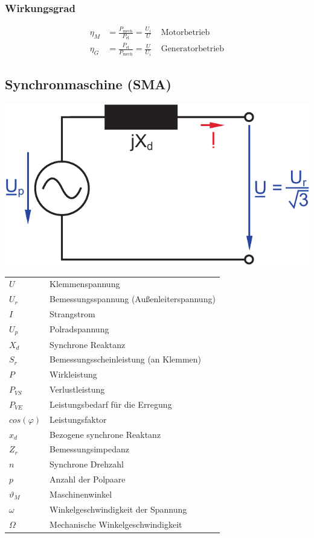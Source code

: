 \documentclass[a4paper,twocolumn,10pt]{article}
\begin{document}
\subsubsection{Wirkungsgrad}
\begin{equation*}
\begin{split}
\eta_M&=\frac{P_{\text{mech}}}{P_{\text{el}}}=\frac{U_i}{U}\;\;\;\;\text{Motorbetrieb}\\
\eta_G&=\frac{P_{\text{el}}}{P_{\text{mech}}}=\frac{U}{U_i}\;\;\;\;\text{Generatorbetrieb}
\end{split}
\end{equation*}

\subsection{Synchronmaschine (SMA)}
\begin{center}
\includegraphics[width=0.7\columnwidth]{Grafiken/Synchronmaschine}
\end{center}
\begin{tabular}{ll}
$U$ & Klemmenspannung\\
$U_r$ & Bemessungsspannung (Außenleiterspannung)\\
$I$ & Strangstrom\\
$U_p$ & Polradspannung\\
$X_d$ & Synchrone Reaktanz\\
$S_r$ & Bemessungsscheinleistung (an Klemmen)\\
$P$ & Wirkleistung\\
$P_{VS}$ & Verlustleistung\\
$P_{VE}$ & Leistungsbedarf für die Erregung\\
$cos(\varphi)$ & Leistungsfaktor\\
$x_d$ & Bezogene synchrone Reaktanz\\
$Z_r$ & Bemessungsimpedanz\\
$n$ & Synchrone Drehzahl\\
$p$ & Anzahl der Polpaare\\
$\vartheta_M$ & Maschinenwinkel\\
$\omega$ & Winkelgeschwindigkeit der Spannung\\
$\Omega$ & Mechanische Winkelgeschwindigkeit
\end{tabular}
\end{document}
